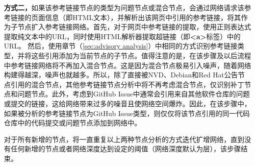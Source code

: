 \textbf{方式二，}如果该参考链接节点的类型为问题节点或混合节点，\tool 会通过网络请求该参考链接的页面信息（即HTML文本），并解析出该网页中引用的参考链接，将其作为子节点扩入参考链接网络。首先，对于网页中参考链接的提取，\tool 使用正则表达式提取纯文本中的URL，同时使用HTML解析器提取超链接（即\textbf{<a>}标签）中的URL。
然后，使用章节（\ref{sec:advisory analysis}）中相同的方式识别参考链接类型，并将这些引用添加为当前节点的子节点。值得注意的是，在该步骤及以后流程中参考链接网络将不再加入混合节点。这是因为混合节点极易引入噪声，随着网络构建得越深，噪声也就越多。所以，除了直接被NVD、Debian和Red Hat公告节点引用的混合节点，其他参考链接节点分析中将不再考虑混合节点，仅识别补丁节点和问题节点。此外，考虑到GitHub Issue中通常会引用来自其他软件仓库的问题或提交的链接，这给网络带来过多的噪音且使网络空间爆炸。因此，在该步骤中，如果被分析的参考链接节点为GitHub Issue类型，则仅仅将该节点引用的同一代码仓库中的代码提交或问题节点添加到网络中。

对于所有新增的节点，\tool 将一直重复以上两种节点分析的方式迭代扩增网络，直到没有任何新增的节点或者网络深度达到设定的阈值（网络深度默认为层），该步骤结束。

